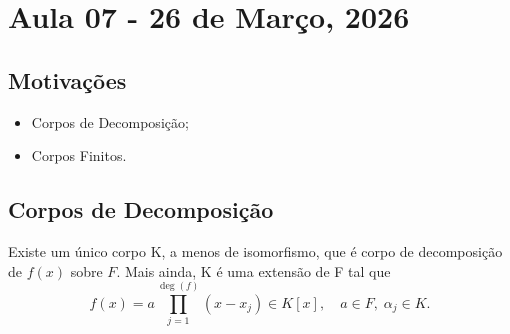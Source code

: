 \documentclass[../algebraIII_notes.tex]{subfiles}
\begin{document}
\section{Aula 07 - 26 de Março, 2026}
\subsection{Motivações}
\begin{itemize}
	\item Corpos de Decomposição;
	\item Corpos Finitos.
\end{itemize}
\subsection{Corpos de Decomposição}
\begin{theorem*}
	Existe um único corpo K, a menos de isomorfismo, que é corpo de decomposição de \(f(x)\) sobre \(F\). Mais ainda, K é uma extensão de F tal que
	\[
		f(x) = a \prod\limits_{j=1}^{\deg{(f)}}(x-x_{j})\in K[x], \quad a\in F,\; \alpha_{j}\in K.
	\]
\end{theorem*}
\end{document}
